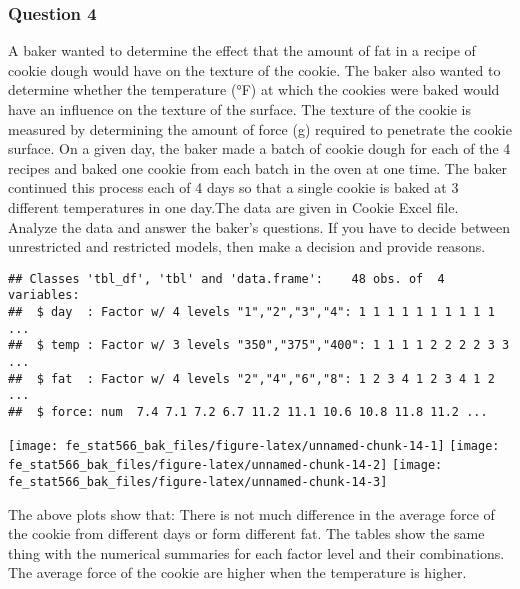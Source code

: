 \documentclass[12pt,]{article}
\begin{document}
\hypertarget{question-4}{%
\subsubsection{Question 4}\label{question-4}}

\textcolor[rgb]{0.7,0.7,0.7}{A baker wanted to determine the effect that the amount of fat in a recipe of cookie dough would have on the texture of the cookie. The baker also wanted to determine whether the temperature (°F) at which the cookies were baked would have an influence on the texture of the surface. The texture of the cookie is measured by determining the amount of force (g) required to penetrate the cookie surface.}
\textcolor[rgb]{0.7,0.7,0.7}{On a given day, the baker made a batch of cookie dough for each of the 4 recipes and baked one cookie from each batch in the oven at one time. The baker continued this process each of 4 days so that a single cookie is baked at 3 different temperatures in one day.The data are given in Cookie Excel file.}
\textcolor[rgb]{0.7,0.7,0.7}{Analyze the data and answer the baker's questions. If you have to decide between unrestricted and restricted models, then make a decision and provide reasons.}

\begin{verbatim}
## Classes 'tbl_df', 'tbl' and 'data.frame':    48 obs. of  4 variables:
##  $ day  : Factor w/ 4 levels "1","2","3","4": 1 1 1 1 1 1 1 1 1 1 ...
##  $ temp : Factor w/ 3 levels "350","375","400": 1 1 1 1 2 2 2 2 3 3 ...
##  $ fat  : Factor w/ 4 levels "2","4","6","8": 1 2 3 4 1 2 3 4 1 2 ...
##  $ force: num  7.4 7.1 7.2 6.7 11.2 11.1 10.6 10.8 11.8 11.2 ...
\end{verbatim}

\texttt{[image: fe\_stat566\_bak\_files/figure-latex/unnamed-chunk-14-1]}
\texttt{[image: fe\_stat566\_bak\_files/figure-latex/unnamed-chunk-14-2]}
\texttt{[image: fe\_stat566\_bak\_files/figure-latex/unnamed-chunk-14-3]}

The above plots show that: There is not much difference in the average
force of the cookie from different days or form different fat. The
tables show the same thing with the numerical summaries for each factor
level and their combinations. The average force of the cookie are higher
when the temperature is higher.
\end{document}
